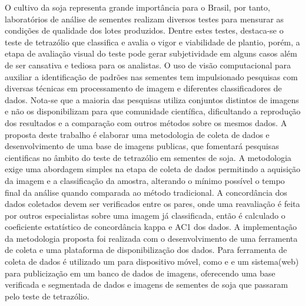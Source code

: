 \begin{resumo} 
	
		O cultivo da soja  representa grande importância para o Brasil, por tanto, laboratórios de análise de sementes realizam diversos testes para mensurar as condições de qualidade dos lotes produzidos. Dentre estes testes, destaca-se o teste de tetrazólio que classifica e avalia o vigor e viabilidade de plantio, porém, a etapa de avaliação visual do teste pode gerar subjetividade em alguns casos além de ser cansativa e tediosa para os analistas. 
		O uso de visão computacional para auxiliar a identificação de padrões nas sementes tem impulsionado pesquisas com diversas técnicas em processamento de imagem e diferentes classificadores de dados. Nota-se que a maioria das pesquisas utiliza conjuntos distintos de imagens e não os disponibilizam para que comunidade científica, dificultando a reprodução dos resultados e a comparação com outros métodos sobre os mesmos dados.
		A proposta deste trabalho é elaborar uma metodologia de coleta de dados e desenvolvimento de uma base de imagens publicas, que fomentará pesquisas cientificas no âmbito do teste de tetrazólio em sementes de soja. 
		A metodologia exige uma abordagem simples na etapa de coleta de dados permitindo a aquisição da imagem e a classificação da amostra, alterando o mínimo possível o tempo final da análise quando comparada ao método tradicional. A concordância dos dados coletados devem ser verificados entre os pares, onde uma reavaliação é feita por outros especialistas sobre uma imagem já classificada, então é calculado o coeficiente estatístico de concordância kappa e AC1 dos dados.
		A implementação da metodologia proposta foi realizada com o desenvolvimento de uma ferramenta de coleta e uma plataforma de disponibilização dos dados. Para ferramenta de coleta de dados é utilizado um  para dispositivo móvel, como  e  e um sistema(web) para publicização em um banco de dados de imagens, oferecendo uma base verificada e segmentada de dados e imagens de sementes de soja que passaram pelo teste de tetrazólio.
		
		
			 
	\end{resumo}
		